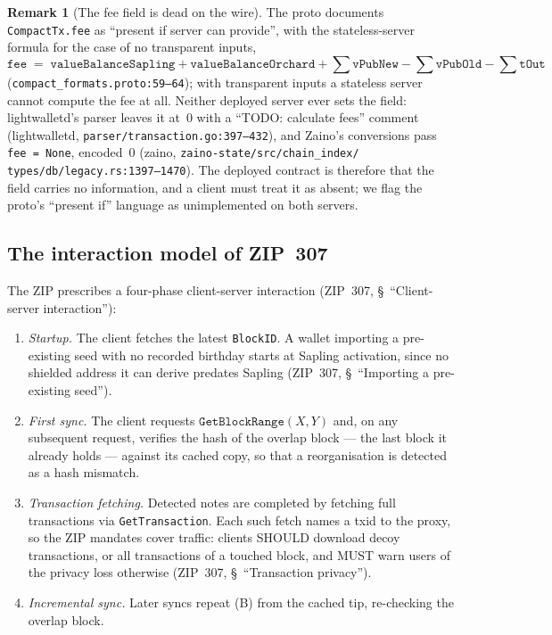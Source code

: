 \documentclass[11pt,a4paper]{article}
\theoremstyle{definition}
\newtheorem{remark}[theorem]{Remark}
\begin{document}
\begin{remark}[The fee field is dead on the wire]\label{rem:sync-fee}
The proto documents \texttt{CompactTx.fee} as ``present if server can
provide'', with the stateless-server formula for the case of no
transparent inputs,
\[
\mathtt{fee} \;=\; \mathtt{valueBalanceSapling} +
\mathtt{valueBalanceOrchard} + \textstyle\sum \mathtt{vPubNew} -
\sum \mathtt{vPubOld} - \sum \mathtt{tOut}
\]
(\texttt{compact\_formats.proto:59--64}); with transparent inputs a
stateless server cannot compute the fee at all. Neither deployed server
ever sets the field: lightwalletd's parser leaves it at~0 with a
``TODO: calculate fees'' comment (\textsf{lightwalletd},
\texttt{parser/transaction.go:397--432}), and Zaino's conversions pass
\texttt{fee = None}, encoded~0 (\textsf{zaino},
\texttt{zaino-state/src/chain\_index/}\allowbreak
\texttt{types/db/legacy.rs:1397--1470}).
The deployed contract is therefore that the field carries no information,
and a client must treat it as absent; we flag the proto's ``present if''
language as unimplemented on both servers.
\end{remark}

\subsection{The interaction model of ZIP~307}\label{sec:sync-interaction}

The ZIP prescribes a four-phase client-server interaction (ZIP~307,
\S~``Client-server interaction''):

\begin{enumerate}[label=(\Alph*)]
\item \emph{Startup.} The client fetches the latest \texttt{BlockID}. A
  wallet importing a pre-existing seed with no recorded birthday starts at
  Sapling activation, since no shielded address it can derive predates
  Sapling (ZIP~307, \S~``Importing a pre-existing seed'').
\item \emph{First sync.} The client requests
  $\mathtt{GetBlockRange}(X, Y)$ and, on any subsequent request, verifies
  the hash of the overlap block --- the last block it already holds ---
  against its cached copy, so that a reorganisation is detected as a hash
  mismatch.
\item \emph{Transaction fetching.} Detected notes are completed by
  fetching full transactions via \texttt{GetTransaction}. Each such fetch
  names a txid to the proxy, so the ZIP mandates cover traffic: clients
  SHOULD download decoy transactions, or all transactions of a touched
  block, and MUST warn users of the privacy loss otherwise (ZIP~307,
  \S~``Transaction privacy'').
\item \emph{Incremental sync.} Later syncs repeat (B) from the cached
  tip, re-checking the overlap block.
\end{enumerate}
\end{document}
